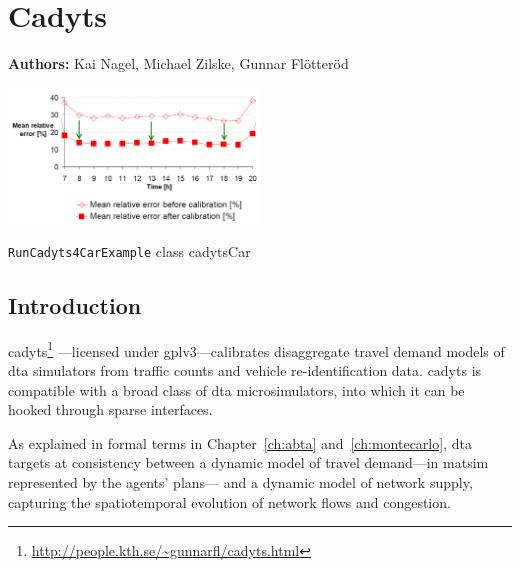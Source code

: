 \chapter{Cadyts}
\label{ch:cadyts}

\hfill \textbf{Authors:} Kai Nagel, Michael Zilske, Gunnar Fl\"otter\"od

\begin{center} \includegraphics[width=0.5\textwidth, angle=0]{extending/figures/cadyts/cadyts} \end{center}

{\lstinline{RunCadyts4CarExample} class}
{cadytsCar}
{\citet[][]{cadyts-manual, floetteroed-2010e, FloetteroedChenEtAl2011BehavioralCalibAndAnaNETS, Floetteroed2008PhD, Moyo2013PhD}}



\section{Introduction}

\gls{cadyts}\footnote{\url{http://people.kth.se/~gunnarfl/cadyts.html}}
---licensed under \gls{gplv3}---calibrates disaggregate travel demand models 
of \gls{dta} simulators from traffic counts and vehicle re-identification data. 
\gls{cadyts} is compatible with a broad class of \gls{dta} microsimulators,
into which it can be hooked through sparse interfaces.

As explained in formal terms in Chapter~\ref{ch:abta} and~\ref{ch:montecarlo}, 
\gls{dta} targets at consistency between a dynamic model of travel 
demand---in \gls{matsim} represented by the agents' plans---
and a dynamic model of network supply, capturing the spatiotemporal
evolution of network flows and congestion.

